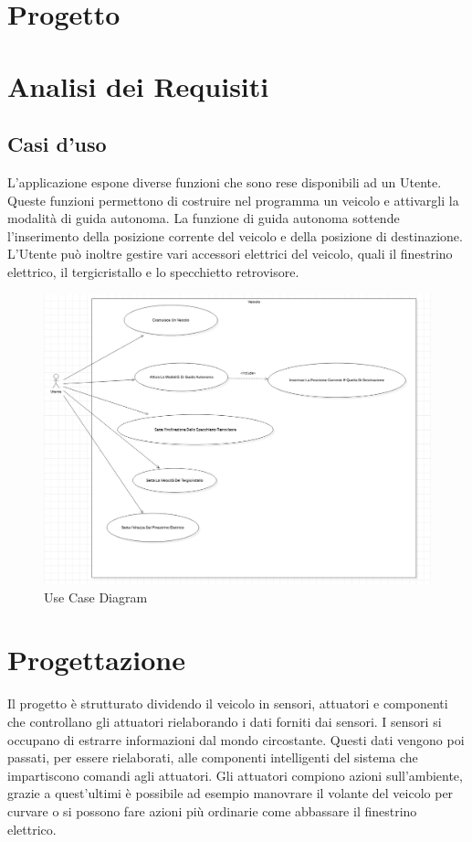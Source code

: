 \documentclass{article}
\begin{document}
\section{Progetto}

\section{Analisi dei Requisiti}
\subsection{Casi d'uso}
L'applicazione espone diverse funzioni che sono rese disponibili ad un Utente. Queste funzioni permettono di costruire nel programma un veicolo e attivargli la modalità di guida autonoma. La funzione di guida autonoma sottende l'inserimento della posizione corrente del veicolo e della posizione di destinazione.
L'Utente può inoltre gestire vari accessori elettrici del veicolo, quali il finestrino elettrico, il tergicristallo e lo specchietto retrovisore. 
\begin{figure} [H]
\includegraphics[width=1\textwidth,center]{UseCaseDiagram.png}
\caption{Use Case Diagram}
\end{figure}
\newpage 

\section{Progettazione}
Il progetto è strutturato dividendo il veicolo in sensori, attuatori e componenti che controllano gli attuatori rielaborando i dati forniti dai sensori. I sensori si occupano di estrarre informazioni dal mondo circostante. Questi dati vengono poi passati, per essere rielaborati, alle componenti intelligenti del sistema che impartiscono comandi agli attuatori. Gli attuatori compiono azioni sull'ambiente, grazie a quest'ultimi è possibile ad esempio manovrare il volante del veicolo per curvare o si possono fare azioni più ordinarie come abbassare il finestrino elettrico.
\end{document}
